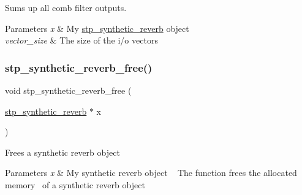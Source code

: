 Sums up all comb filter outputs. ~\newline
 


\begin{DoxyParams}{Parameters}
{\em x} & My \hyperlink{structstp__synthetic__reverb}{stp\+\_\+synthetic\+\_\+reverb} object ~\newline
 \\
\hline
{\em vector\+\_\+size} & The size of the i/o vectors ~\newline
 \\
\hline
\end{DoxyParams}
\mbox{\label{structstp__synthetic__reverb_aeebd2c68f0dc77806a15cf3224acc4ca}} 
\subsubsection{\texorpdfstring{stp\+\_\+synthetic\+\_\+reverb\+\_\+free()}{stp\_synthetic\_reverb\_free()}}
{\footnotesize\ttfamily void stp\+\_\+synthetic\+\_\+reverb\+\_\+free (\begin{DoxyParamCaption}\item[{\hyperlink{structstp__synthetic__reverb}{stp\+\_\+synthetic\+\_\+reverb} $\ast$}]{x }\end{DoxyParamCaption})\hspace{0.3cm}{\ttfamily [related]}}



Frees a synthetic reverb object~\newline
 


\begin{DoxyParams}{Parameters}
{\em x} & My synthetic reverb object ~\newline
 The function frees the allocated memory~\newline
 of a synthetic reverb object \\
\hline
\end{DoxyParams}
\mbox{\label{structstp__synthetic__reverb_a8588857ee9bf58eaebcf308980ac1167}} 
